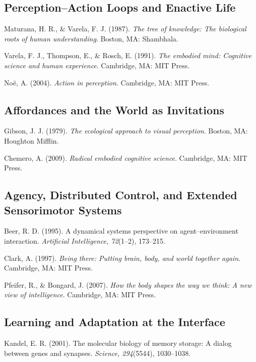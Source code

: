 \documentclass[
  openright]{book}
\begin{document}
\subsection{Perception--Action Loops and Enactive
Life}\label{perceptionaction-loops-and-enactive-life}

Maturana, H. R., \& Varela, F. J. (1987). \emph{The tree of knowledge:
The biological roots of human understanding}. Boston, MA: Shambhala.

Varela, F. J., Thompson, E., \& Rosch, E. (1991). \emph{The embodied
mind: Cognitive science and human experience}. Cambridge, MA: MIT Press.

Noë, A. (2004). \emph{Action in perception}. Cambridge, MA: MIT Press.

\subsection{Affordances and the World as
Invitations}\label{affordances-and-the-world-as-invitations-1}

Gibson, J. J. (1979). \emph{The ecological approach to visual
perception}. Boston, MA: Houghton Mifflin.

Chemero, A. (2009). \emph{Radical embodied cognitive science}.
Cambridge, MA: MIT Press.

\subsection{Agency, Distributed Control, and Extended Sensorimotor
Systems}\label{agency-distributed-control-and-extended-sensorimotor-systems}

Beer, R. D. (1995). A dynamical systems perspective on
agent--environment interaction. \emph{Artificial Intelligence,
72}(1--2), 173--215.

Clark, A. (1997). \emph{Being there: Putting brain, body, and world
together again}. Cambridge, MA: MIT Press.

Pfeifer, R., \& Bongard, J. (2007). \emph{How the body shapes the way we
think: A new view of intelligence}. Cambridge, MA: MIT Press.

\subsection{Learning and Adaptation at the
Interface}\label{learning-and-adaptation-at-the-interface}

Kandel, E. R. (2001). The molecular biology of memory storage: A dialog
between genes and synapses. \emph{Science, 294}(5544), 1030--1038.
\end{document}
